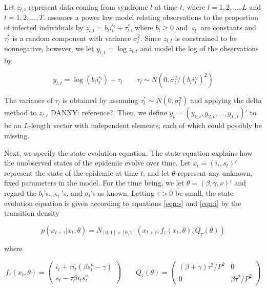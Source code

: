 \documentclass{elsarticle}
\newcommand{\danny}[1]{{\color{blue}DANNY: #1}}
\begin{document}
Let $z_{l,t}$ represent data coming from syndrome $l$ at time $t$, where $l = 1,2,\ldots,L$ and $t = 1,2,\ldots,T$.  \citet{skvortsov2012monitoring} assumes a power law model relating observations to the proportion of infected individuals by $z_{l,t} = b_li_t^{\varsigma_l} + \tau^*_l$, where $b_l \ge 0$ and $\varsigma_l$ are constants and $\tau^*_l$ is a random component with variance $\sigma_l^2$.  Since $z_{l,t}$ is constrained to be nonnegative, however, we let $y_{l,t} = \log z_{l,t}$ and model the log of the observations by

\begin{equation}
y_{l,t} = \log \left(b_li_t^{\varsigma_l}\right) + \tau_l \qquad \tau_l \sim N\left(0,\sigma_l^2 / (b_li_t^{\varsigma_l})^2\right) \label{eqn:obs}
\end{equation}

\noindent The variance of $\tau_l$ is obtained by assuming $\tau^*_l \sim N(0,\sigma_l^2)$ and applying the delta method to $z_{l,t}$ \danny{reference?}.  Then, we define $y_t = (y_{1,t},y_{2,t},\ldots,y_{L,t})'$ to be an $L$-length vector with independent elements, each of which could possibly be missing.

Next, we specify the state evolution equation.  The state equation explains how the unobserved states of the epidemic evolve over time.  Let $x_t = (i_t,s_t)'$ represent the state of the epidemic at time $t$, and let $\theta$ represent any unknown, fixed parameters in the model.  For the time being, we let $\theta = (\beta, \gamma, \nu)'$ and regard the $b_l$'s, $\varsigma_l$'s, and $\sigma_l$'s as known.  Letting $\tau > 0$ be small, the state evolution equation is given according to equations \eqref{eqn:s} and \eqref{eqn:i} by the transition density

\begin{equation}
p\left(x_{t+\tau}\left|x_t,\theta\right.\right) = N_{[0,1]\times[0,1]}\left(x_{t+\tau};f_\tau(x_t,\theta),Q_{\tau}(\theta)\right) \label{eqn:state}
\end{equation}

\noindent where

\[
f_\tau(x_t,\theta) = \left(
\begin{array}{c}
i_t + \tau i_t(\beta s^{\nu}_t - \gamma) \\
s_t - \tau\beta i_ts^{\nu}_t
\end{array}
\right)
\qquad
Q_\tau(\theta) = \left(
\begin{array}{ccccc}
(\beta + \gamma)\tau^2/P^2 & 0 \\
0 & \beta\tau^2/P^2
\end{array}
\right)
\]
\end{document}
